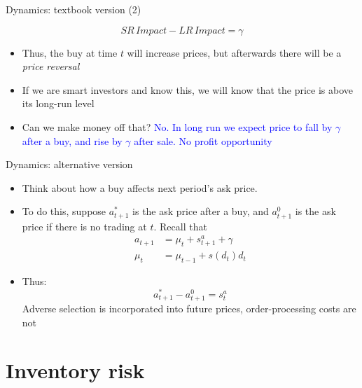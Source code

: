 \documentclass[english,10pt]{beamer}
\begin{document}
\begin{frame}{Dynamics: textbook version (2)}
	\begin{block}{}
		\[
		SR \, Impact - LR \, Impact = \gamma
		\]
	\end{block}
	\begin{itemize}
		\item Thus, the buy at time $t$ will increase prices, but afterwards there will be a \textit{price reversal}
		\item If we are smart investors and know this, we will know that the price is above its long-run level
		\item Can we make money off that? \pause \textcolor{blue}{No. In long run we expect price to fall by $\gamma$ after a buy, and rise by $\gamma$ after sale. No profit opportunity}
	\end{itemize}
\end{frame}


\begin{frame}{Dynamics: alternative version}
	\begin{itemize}
		\item Think about how a buy affects next period's ask price. 
		\item To do this, suppose $a^*_{t+1}$ is the ask price after a buy, and $a^0_{t+1}$ is the ask price if there is no trading at $t$. Recall that 
		\begin{align*}
		a_{t+1} & = \mu_t + s^a_{t+1} + \gamma \\
		\mu_t & = \mu_{t-1} + s(d_t) d_t
		\end{align*}
		\item Thus:
		\[
		a^*_{t+1} - a^0_{t+1} = s^a_{t}
		\]
		Adverse selection is incorporated into future prices, order-processing costs are not
	\end{itemize}
\end{frame}



\section{Inventory risk}
\end{document}
